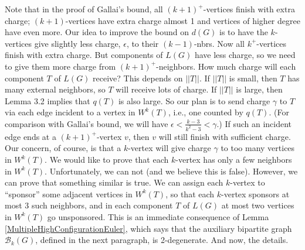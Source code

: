 \documentclass[12pt]{article}
\theoremstyle{plain}
\theoremstyle{definition}
\theoremstyle{remark}
\newcommand{\fancy}[1]{\mathcal{#1}}
\newcommand{\B}{\fancy{B}}
\begin{document}
Note that in the proof of Gallai's bound, all $(k+1)^+$-vertices finish with extra charge; $(k+1)$-vertices have extra
charge almost 1 and vertices of higher degree have even more.  Our idea to improve the bound on $d(G)$ is to have the 
$k$-vertices give slightly less charge, $\epsilon$, to their $(k-1)$-nbrs.  Now all $k^+$-vertices finish with extra charge.  
But components of $L(G)$ have less charge, so we need to give them more charge from $(k+1)^+$-neighbors.  
How much charge will each component $T$ of $L(G)$ receive? This depends on $||T||$.  If $||T||$ is small, then $T$ has many 
external neighbors, so $T$ will receive lots of charge.  If $||T||$ is large, then Lemma 3.2 implies that $q(T)$ is also large.  
So our plan is to send charge $\gamma$ to $T$ via each edge incident to a vertex in $W^k(T)$, i.e., one counted by 
$q(T)$.  (For comparison with Gallai's bound, we will have $\epsilon < \frac{k-3}{k^2-3} < \gamma$.)  If such an incident edge 
ends at a $(k+1)^+$-vertex $v$, then $v$ will still finish with sufficient charge.  Our concern, of course, is that a
$k$-vertex will give charge $\gamma$ to too many vertices in $W^k(T)$.  We would like to prove that each $k$-vertex has only a 
few neighbors in $W^k(T)$.  Unfortunately, we can not (and we believe this is false). However, we can prove that something similar 
is true.  We can assign each $k$-vertex to ``sponsor'' some adjacent vertices in $W^k(T)$, so that each $k$-vertex sponsors at 
most 3 such neighbors, and in each component $T$ of $L(G)$ at most two vertices in $W^k(T)$ go unsponsored.  This is an immediate
consequence of Lemma \ref{MultipleHighConfigurationEuler}, which says that the auxiliary bipartite graph $\B_k(G)$, defined in 
the next paragraph, is 2-degenerate.  And now, the details.
\end{document}
